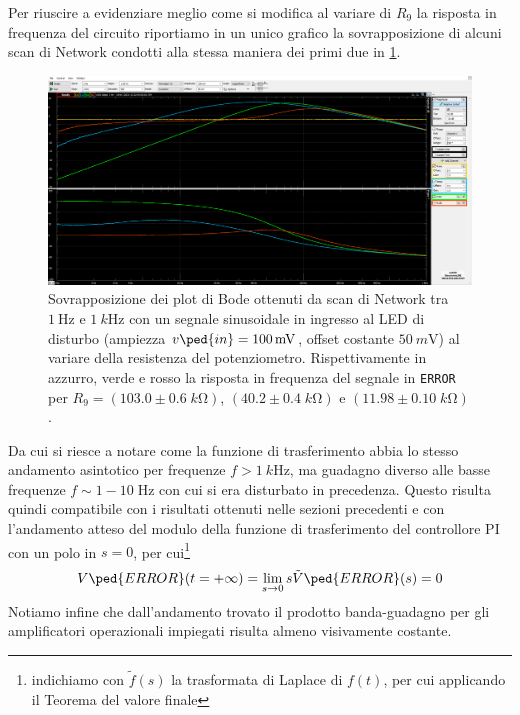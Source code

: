 \documentclass[10pt, a4paper, italian]{article}
\begin{document}
Per riuscire a evidenziare meglio come si modifica al variare di $R_9$ la
risposta in frequenza del circuito riportiamo in un unico grafico la
sovrapposizione di alcuni scan di Network condotti alla stessa maniera dei
primi due in \cref{fig: netR9func}.
\begin{figure}[htbp]
    \centering
	\includegraphics[width=\textwidth]{netR9func}
    \caption{Sovrapposizione dei plot di Bode ottenuti da scan di Network tra
    $\SI{1}{\Hz}$ e $\SI{1}{k\Hz}$ con un segnale sinusoidale in ingresso al
    LED di disturbo (ampiezza $v\ped{in} = \SI{100}{m\V}$, offset costante
    $\SI{50}{m\V}$) al variare della resistenza del potenziometro. 
	Rispettivamente in azzurro, verde e rosso la risposta in frequenza del
	segnale in \texttt{ERROR} per $R_9 = (103.0 \pm 0.6 \; \si{k\ohm})$,
	$(40.2 \pm 0.4 \; \si{k\ohm})$ e $(11.98 \pm 0.10 \; \si{k\ohm})$.
    \label{fig: netR9func}}
\end{figure}

Da cui si riesce a notare come la funzione di trasferimento abbia lo stesso
andamento asintotico per frequenze $f > \SI{1}{k\Hz}$, ma guadagno diverso
alle basse frequenze $f \sim 1 - 10 \; \si{\Hz}$ con cui si era disturbato in
precedenza. Questo risulta quindi compatibile con i risultati ottenuti nelle
sezioni precedenti e con l'andamento atteso del modulo della funzione di
trasferimento del controllore PI con un polo in $s = 0$, per cui\footnote{
indichiamo con $\tilde{f} (s)$ la trasformata di Laplace di $f(t)$, per cui
applicando il Teorema del valore finale}
\begin{equation}
V\ped{ERROR} (t = +\infty) = \lim_{s \to 0} s \tilde{V}\ped{ERROR}(s) = 0
\end{equation}
Notiamo infine che dall'andamento trovato il prodotto banda-guadagno per
gli amplificatori operazionali impiegati risulta almeno visivamente costante.

\end{document}
